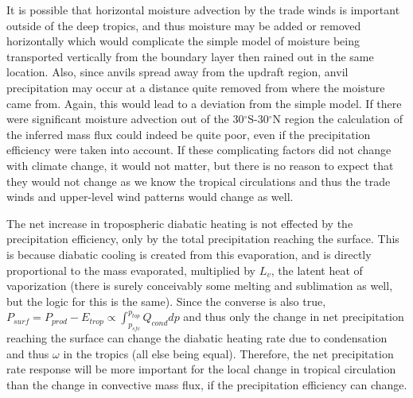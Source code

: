 \documentclass[letterpaper,12pt,titlepage,oneside,final]{book}
\begin{document}
It is possible that horizontal moisture advection by the trade winds is important outside of the deep tropics, and thus moisture may be added or removed horizontally which would complicate the simple model of moisture being transported vertically from the boundary layer then rained out in the same location. Also, since anvils spread away from the updraft region, anvil precipitation may occur at a distance quite removed from where the moisture came from. Again, this would lead to a deviation from the simple model. If there were significant moisture advection out of the 30$^{\circ}$S-30$^{\circ}$N region the calculation of the inferred mass flux could indeed be quite poor, even if the precipitation efficiency were taken into account. If these complicating factors did not change with climate change, it would not matter, but there is no reason to expect that they would not change as we know the tropical circulations and thus the trade winds and upper-level wind patterns would change as well. 

The net increase in tropospheric diabatic heating is not effected by the precipitation efficiency, only by the total precipitation reaching the surface. This is because diabatic cooling is created from this evaporation, and is directly proportional to the mass evaporated, multiplied by $L_{v}$, the latent heat of vaporization (there is surely conceivably some melting and sublimation as well, but the logic for this is the same). Since the converse is also true, $P_{surf}=P_{prod}-E_{trop} \propto \int_{p_{sfc}}^{p_{top}}Q_{cond}dp$ and thus only the change in net precipitation reaching the surface can change the diabatic heating rate due to condensation and thus $\omega$ in the tropics (all else being equal). Therefore, the net precipitation rate response will be more important for the local change in tropical circulation than the change in convective mass flux, if the precipitation efficiency can change.
\end{document}
